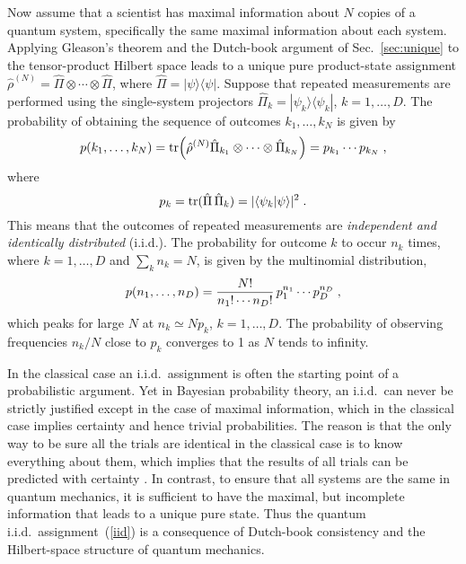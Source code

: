 \documentclass[aps,12pt]{revtex4}
\begin{document}
Now assume that a scientist has maximal information about $N$
copies of a quantum system, specifically the same maximal information
about each system.  Applying Gleason's theorem and the Dutch-book
argument of Sec.~\ref{sec:unique} to the tensor-product Hilbert space
leads to a unique pure product-state assignment
$\hat\rho^{(N)}=\hat\Pi\otimes\cdots\otimes\hat\Pi$, where
$\hat\Pi=|\psi\rangle\langle\psi|$. Suppose that repeated
measurements are performed using the single-system projectors
$\hat\Pi_k=|\psi_k\rangle\langle\psi_k|$, $k=1,\ldots,D$. The
probability of obtaining the sequence of outcomes $k_1,\ldots,k_N$ is
given by
\begin{equation}
p(k_1,\ldots,k_N)=
{\rm tr}
\Bigl(\hat\rho^{(N)}\hat\Pi_{k_1}\otimes\cdots\otimes\hat\Pi_{k_N}\Bigr)=
p_{k_1}\cdots p_{k_N}\;,
\label{eq:pk}
\end{equation}
where
\begin{equation}
p_k={\rm tr}(\hat\Pi\,\hat\Pi_k)=|\langle\psi_k|\psi\rangle|^2\;.
\end{equation}
This means that the outcomes of repeated measurements are {\it
independent and identically distributed\/} (i.i.d.).  The probability
for outcome $k$ to occur $n_k$ times, where $k=1,\ldots,D$ and
$\sum_k n_k=N$, is given by the multinomial distribution,
\begin{equation}
\label{iid}
p(n_1,\ldots,n_D)={N!\over n_1!\cdots n_D!}\,p_1^{n_1}\cdots p_D^{n_D}\;,
\end{equation}
which peaks for large $N$ at $n_k\simeq Np_k$, $k=1,\ldots,D$.  The
probability of observing frequencies $n_k/N$ close to $p_k$ converges
to 1 as $N$ tends to infinity.

In the classical case an i.i.d.\ assignment is often the starting
point of a probabilistic argument.  Yet in Bayesian probability
theory, an i.i.d.\ can never be strictly justified except in the case
of maximal information, which in the classical case implies certainty
and hence trivial probabilities.  The reason is that the only way to
be sure all the trials are identical in the classical case is to know
everything about them, which implies that the results of all trials
can be predicted with certainty \cite{Jaynespost}.   In contrast, to
ensure that all systems are the same in quantum mechanics, it is
sufficient to have the maximal, but incomplete information that leads
to a unique pure state.  Thus the quantum i.i.d.\
assignment~(\ref{iid}) is a consequence of Dutch-book consistency and
the Hilbert-space structure of quantum mechanics.
\end{document}
